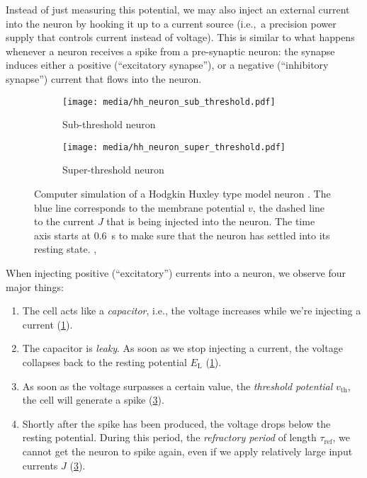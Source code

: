 \documentclass[10pt,letterpaper,oneside]{article}
\begin{document}
Instead of just measuring this potential, we may also inject an external current into the neuron by hooking it up to a current source (i.e.,~a precision power supply that controls current instead of voltage). This is similar to what happens whenever a neuron receives a spike from a pre-synaptic neuron: the synapse induces either a positive (\enquote{excitatory synapse}), or a negative (\enquote{inhibitory synapse}) current that flows into the neuron.

\begin{figure}
	\centering%
	\begin{subfigure}{0.5\textwidth}%
		\centering
		\texttt{[image: media/hh\_neuron\_sub\_threshold.pdf]}%
		\caption{Sub-threshold neuron}%
		\label{fig:hh_neuron_sub_threshold}
	\end{subfigure}%
	\begin{subfigure}{0.5\textwidth}%
		\centering
		\texttt{[image: media/hh\_neuron\_super\_threshold.pdf]}%
		\caption{Super-threshold neuron}%
		\label{fig:hh_neuron_super_threshold}
	\end{subfigure}%
	\caption{Computer simulation of a Hodgkin Huxley type model neuron \cite{hodgkin1952quantitative,traub1991neuronal}. The blue line corresponds to the membrane potential $v$, the dashed line to the current $J$ that is being injected into the neuron. The time axis starts at \SI{0.6}{\second} to make sure that the neuron has settled into its resting state. , }
\end{figure}

When injecting positive (\enquote{excitatory}) currents into a neuron, we observe four major things:
\begin{enumerate}
	\item The cell acts like a \emph{capacitor}, i.e., the voltage increases while we're injecting a current (\cref{fig:hh_neuron_sub_threshold}).
	\item The capacitor is \emph{leaky}. As soon as we stop injecting a current, the voltage collapses back to the resting potential $E_\mathrm{L}$ (\cref{fig:hh_neuron_sub_threshold}).
	\item As soon as the voltage surpasses a certain value, the \emph{threshold potential} $v_\mathrm{th}$, the cell will generate a spike (\cref{fig:hh_neuron_super_threshold}).
	\item Shortly after the spike has been produced, the voltage drops below the resting potential. During this period, the \emph{refractory period} of length $\tau_\mathrm{ref}$, we cannot get the neuron to spike again, even if we apply relatively large input currents $J$ (\cref{fig:hh_neuron_super_threshold}).
\end{enumerate}
\end{document}
